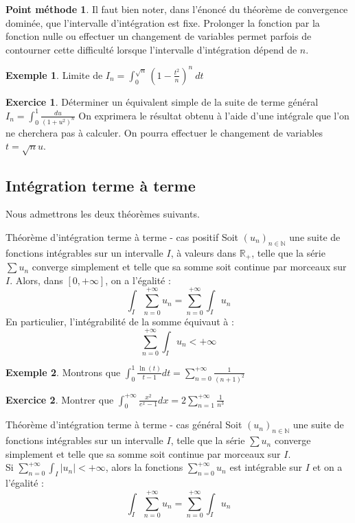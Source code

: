 \documentclass[french]{article}
\newcommand{\N}{\mathbb{N}}
\newcommand{\R}{\mathbb{R}}
\theoremstyle{plain}
\theoremstyle{definition}
\newtheorem*{ex}{Exemple}
\newtheorem*{met}{Point méthode}
\newtheorem{exo}{Exercice}
\theoremstyle{remark}
\begin{document}
\begin{met}
	Il faut bien noter, dans l'énoncé du théorème de convergence dominée, que l'intervalle d'intégration est fixe. Prolonger la fonction par la fonction nulle ou effectuer un changement de variables permet parfois de contourner cette difficulté lorsque l'intervalle d'intégration dépend de $n$.
\end{met}

\begin{ex}
	Limite de $\displaystyle I_n=\int_{0}^{\sqrt{n}}\left(1-\frac{t^2}{n}\right)^n\ dt$
\end{ex}

\begin{exo}
	Déterminer un équivalent simple de la suite de terme général $I_n=\displaystyle\int_{0}^{1}\frac{du}{(1+u^2)^n}$ On exprimera le résultat obtenu à l'aide d'une intégrale que l'on ne cherchera pas à calculer. On pourra effectuer le changement de variables $t=\sqrt{n}u$.
\end{exo}

\subsection{Intégration terme à terme}

Nous admettrons les deux théorèmes suivants.

\begin{thm}{Théorème d'intégration terme à terme - cas positif}
	Soit $(u_n)_{n\in\N}$ une suite de fonctions intégrables sur un intervalle $I$, à valeurs dans $\R_+$, telle que la série $\sum u_n$ converge simplement et telle que sa somme soit continue par morceaux sur $I$. Alors, dans $[0,+\infty]$, on a l'égalité : $$\int_I\sum_{n=0}^{+\infty}u_n=\sum_{n=0}^{+\infty}\int_I u_n$$ En particulier, l'intégrabilité de la somme équivaut à : $$\sum_{n=0}^{+\infty}\int_I u_n<+\infty$$
\end{thm}

\begin{ex}
	Montrons que $\displaystyle\int_{0}^{1}\frac{\ln(t)}{t-1}dt=\sum_{n=0}^{+\infty}\frac{1}{(n+1)^2}$
\end{ex}

\begin{exo}
	Montrer que $\displaystyle\int_{0}^{+\infty}\frac{x^2}{e^x-1}dx=2\sum_{n=1}^{+\infty}\frac{1}{n^3}$
\end{exo}

\begin{thm}{Théorème d'intégration terme à terme - cas général}
	Soit $(u_n)_{n\in\N}$ une suite de fonctions intégrables sur un intervalle $I$, telle que la série $\sum u_n$ converge simplement et telle que sa somme soit continue par morceaux sur $I$.\\ Si $\displaystyle\sum_{n=0}^{+\infty}\int_I\lvert u_n\rvert<+\infty$, alors la fonctions $\displaystyle\sum_{n=0}^{+\infty}u_n$ est intégrable sur $I$ et on a l'égalité : $$\int_I\sum_{n=0}^{+\infty}u_n=\sum_{n=0}^{+\infty}\int_I u_n$$
\end{thm}
\end{document}
